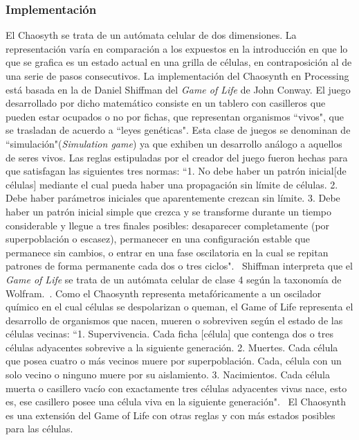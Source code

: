 \documentclass[16pt,spanish]{article}
\begin{document}
\subsubsection{Implementación}

	El Chaosyth se trata de un autómata celular de dos dimensiones. La
	representación varía en comparación a los expuestos en la introducción en que
	lo que se grafica es un estado actual en una grilla de células, en
	contraposición al de una serie de pasos consecutivos. La implementación del
	Chaosynth en Processing está basada en la de Daniel Shiffman del \textit{Game
	of Life} de John Conway. El juego desarrollado por dicho matemático consiste
	en un tablero con casilleros que pueden estar ocupados o no por fichas, que
	representan organismos ``vivos", que se trasladan de acuerdo a ``leyes
	genéticas". Esta clase de juegos se denominan de
	``simulación"(\textit{Simulation game}) ya que exhiben un desarrollo análogo
	a aquellos de seres vivos. Las reglas estipuladas por el creador del juego
	fueron hechas para que satisfagan las siguientes tres normas: ``1. No debe
	haber un patrón inicial[de células] mediante el cual pueda haber una
	propagación sin límite de células. 2. Debe haber parámetros iniciales que
	aparentemente crezcan sin límite. 3. Debe haber un patrón inicial simple que
	crezca y se transforme durante un tiempo considerable y llegue a tres finales
	posibles: desaparecer completamente (por superpoblación o escasez),
	permanecer en una configuración estable que permanece sin cambios, o entrar
	en una fase oscilatoria en la cual se repitan patrones de forma permanente
	cada dos o tres ciclos".~\cite{gardner1971mathematical} Shiffman interpreta
	que el \textit{Game of Life} se trata de un autómata celular de clase 4 según
	la taxonomía de Wolfram.~\cite{shiffman2012nature}. Como el Chaosynth
	representa metafóricamente a un oscilador químico en el cual células se
	despolarizan o queman, el Game of Life representa el desarrollo de organismos
	que nacen, mueren o sobreviven según el estado de las células vecinas: ``1.
	Supervivencia. Cada ficha [célula] que contenga dos o tres células adyacentes
	sobrevive a la siguiente generación. 2. Muertes. Cada célula que posea cuatro
	o más vecinos muere por superpoblación. Cada, célula con un solo vecino o
	ninguno muere por su aislamiento. 3. Nacimientos. Cada célula muerta o
	casillero vacío con exactamente tres células adyacentes vivas nace, esto es,
	ese casillero posee una célula viva en la siguiente
	generación".~\cite{gardner1971mathematical} El Chaosynth es una extensión del
	Game of Life con otras reglas y con más estados posibles para las células.
	
\end{document}
